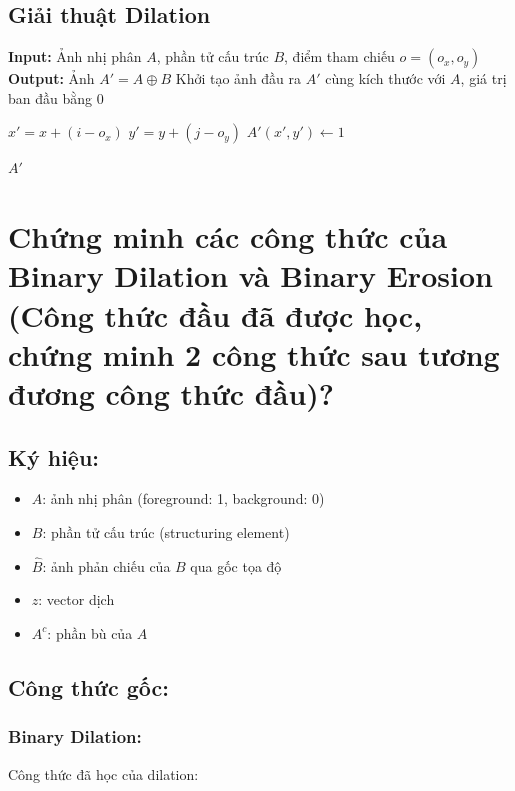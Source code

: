 \documentclass[12pt]{article}
\begin{document}
	\subsection*{Giải thuật Dilation}
	\begin{algorithm}[H]
	\begin{algorithmic}[1]
	\State \textbf{Input:} Ảnh nhị phân $A$, phần tử cấu trúc $B$, điểm tham chiếu $o = (o_x, o_y)$
	\State \textbf{Output:} Ảnh $A' = A \oplus B$
	\State Khởi tạo ảnh đầu ra $A'$ cùng kích thước với $A$, giá trị ban đầu bằng 0
	
	\State $x' = x + (i - o_x)$
	\State $y' = y + (j - o_y)$
	\State $A'(x', y') \gets 1$
	\EndIf
	\EndIf
	\EndFor
	\EndIf
	\EndFor
	
	\State \Return $A'$
	\end{algorithmic}
	\end{algorithm}
	
	\section{Chứng minh các công thức của Binary Dilation và Binary Erosion (Công thức đầu đã được học, chứng minh 2 công thức sau tương đương công thức đầu)? }
	
	\subsection*{Ký hiệu:}
	\begin{itemize}
	\item $A$: ảnh nhị phân (foreground: 1, background: 0)
	\item $B$: phần tử cấu trúc (structuring element)
	\item $\hat{B}$: ảnh phản chiếu của $B$ qua gốc tọa độ
	\item $z$: vector dịch
	\item $A^c$: phần bù của $A$
	\end{itemize}
	
	\subsection*{Công thức gốc:}
	
	\subsubsection*{Binary Dilation:}
	Công thức đã học của dilation:
	
\end{document}
